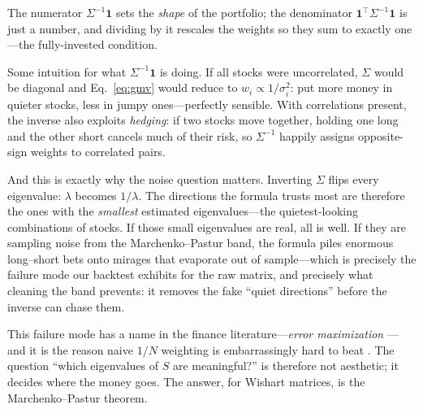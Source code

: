 \documentclass[11pt]{article}
\begin{document}
The numerator $\Sigma^{-1}\mathbf 1$ sets the \emph{shape} of the
portfolio; the denominator $\mathbf 1^{\top}\Sigma^{-1}\mathbf 1$ is
just a number, and dividing by it rescales the weights so they sum to
exactly one---the fully-invested condition.

Some intuition for what $\Sigma^{-1}\mathbf 1$ is doing. If all stocks
were uncorrelated, $\Sigma$ would be diagonal and
Eq.~\eqref{eq:gmv} would reduce to $w_i \propto 1/\sigma_i^{2}$: put
more money in quieter stocks, less in jumpy ones---perfectly sensible.
With correlations present, the inverse also exploits \emph{hedging}: if
two stocks move together, holding one long and the other short cancels
much of their risk, so $\Sigma^{-1}$ happily assigns opposite-sign
weights to correlated pairs.

And this is exactly why the noise question matters. Inverting $\Sigma$
flips every eigenvalue: $\lambda$ becomes $1/\lambda$. The directions
the formula trusts most are therefore the ones with the
\emph{smallest} estimated eigenvalues---the quietest-looking
combinations of stocks. If those small eigenvalues are real, all is
well. If they are sampling noise from the Marchenko--Pastur band, the
formula piles enormous long--short bets onto mirages that evaporate out
of sample---which is precisely the failure mode our backtest exhibits
for the raw matrix, and precisely what cleaning the band prevents: it
removes the fake ``quiet directions'' before the inverse can chase
them.

This failure mode has a name in the finance literature---\emph{error
maximization} \cite{michaud1989}---and it is the reason naive $1/N$
weighting is embarrassingly hard to beat \cite{demiguel2009}. The
question ``which eigenvalues of $S$ are meaningful?'' is therefore not
aesthetic; it decides where the money goes. The answer, for Wishart
matrices, is the Marchenko--Pastur theorem.
\end{document}
